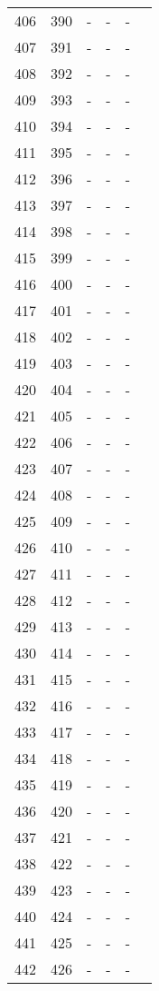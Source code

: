 \begin{longtable}{rrrrrr}
  406 & 390 & - & - & - &  \\ 
  407 & 391 & - & - & - &  \\ 
  408 & 392 & - & - & - &  \\ 
  409 & 393 & - & - & - &  \\ 
  410 & 394 & - & - & - &  \\ 
  411 & 395 & - & - & - &  \\ 
  412 & 396 & - & - & - &  \\ 
  413 & 397 & - & - & - &  \\ 
  414 & 398 & - & - & - &  \\ 
  415 & 399 & - & - & - &  \\ 
  416 & 400 & - & - & - &  \\ 
  417 & 401 & - & - & - &  \\ 
  418 & 402 & - & - & - &  \\ 
  419 & 403 & - & - & - &  \\ 
  420 & 404 & - & - & - &  \\ 
  421 & 405 & - & - & - &  \\ 
  422 & 406 & - & - & - &  \\ 
  423 & 407 & - & - & - &  \\ 
  424 & 408 & - & - & - &  \\ 
  425 & 409 & - & - & - &  \\ 
  426 & 410 & - & - & - &  \\ 
  427 & 411 & - & - & - &  \\ 
  428 & 412 & - & - & - &  \\ 
  429 & 413 & - & - & - &  \\ 
  430 & 414 & - & - & - &  \\ 
  431 & 415 & - & - & - &  \\ 
  432 & 416 & - & - & - &  \\ 
  433 & 417 & - & - & - &  \\ 
  434 & 418 & - & - & - &  \\ 
  435 & 419 & - & - & - &  \\ 
  436 & 420 & - & - & - &  \\ 
  437 & 421 & - & - & - &  \\ 
  438 & 422 & - & - & - &  \\ 
  439 & 423 & - & - & - &  \\ 
  440 & 424 & - & - & - &  \\ 
  441 & 425 & - & - & - &  \\ 
  442 & 426 & - & - & - &  \\ 

\end{longtable}
